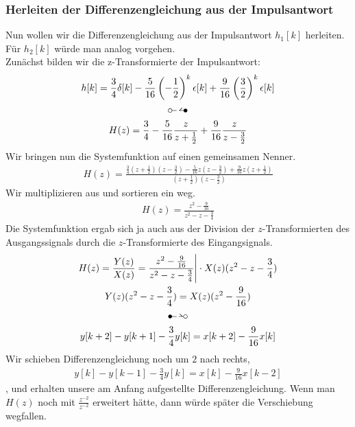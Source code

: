 \documentclass[11pt,a4paper,DIV=12]{scrartcl}
\begin{document}
\subsubsection*{Herleiten der Differenzengleichung aus der Impulsantwort}
Nun wollen wir die Differenzengleichung aus der Impulsantwort $h_1[k]$ herleiten. Für $h_2[k]$ würde man analog vorgehen.\\
Zunächst bilden wir die z-Transformierte der Impulsantwort:
\begin{gather}
	h[k]=\frac{3}{4}\delta[k]-\frac{5}{16}\left(-\frac{1}{2}\right)^k\epsilon[k]+\frac{9}{16}\left(\frac{3}{2}\right)^k\epsilon[k]\\
	\ztransf\nonumber\\
	H(z)=\frac{3}{4}-\frac{5}{16}\frac{z}{z+\frac{1}{2}}+\frac{9}{16}\frac{z}{z-\frac{3}{2}}
\end{gather}
Wir bringen nun die Systemfunktion auf einen gemeinsamen Nenner.
\begin{align}
	H(z)=\frac{\frac{3}{4}(z+\frac{1}{2})(z-\frac{3}{2})-\frac{5}{16}z(z-\frac{3}{2})+\frac{9}{16}z(z+\frac{1}{2})}{(z+\frac{1}{2})(z-\frac{3}{2})}
\end{align}
Wir multiplizieren aus und sortieren ein weg.
\begin{gather}
	H(z)=\frac{z^2-\frac{9}{16}}{z^2-z-\frac{3}{4}}
\end{gather}
Die Systemfunktion ergab sich ja auch aus der Division der $z$-Transformierten des Ausgangssignals durch die $z$-Transformierte des Eingangsignals.
\begin{gather}
	H(z)=\frac{Y(z)}{X(z)}=\frac{z^2-\frac{9}{16}}{z^2-z-\frac{3}{4}}\Bigg |\cdot X(z)(z^2-z-\frac{3}{4})\\
	Y(z)(z^2-z-\frac{3}{4})=X(z)(z^2-\frac{9}{16})\\
	\Ztransf\nonumber \\
	y[k+2]-y[k+1]-\frac{3}{4}y[k]=x[k+2]-\frac{9}{16}x[k]
\end{gather}
Wir schieben Differenzengleichung noch um $2$ nach rechts,
\begin{align}
	y[k]-y[k-1]-\frac{3}{4}y[k]=x[k]-\frac{9}{16}x[k-2]
\end{align}
, und erhalten unsere am Anfang aufgestellte Differenzengleichung. Wenn man $H(z)$ noch mit $\frac{z^{-2}}{z^{-2}}$ erweitert hätte, dann würde später die Verschiebung wegfallen.
\newpage
\end{document}
